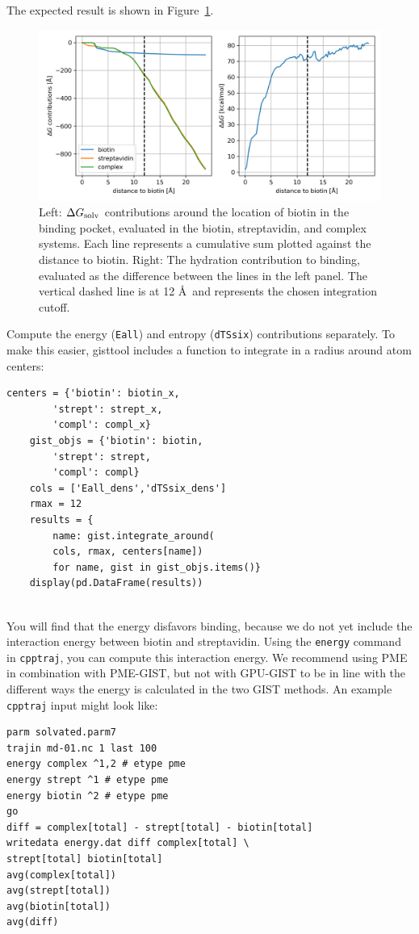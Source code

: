 \documentclass[9pt,tutorial]{livecoms}
\newcommand{\dgsolv}{\Delta G_\textup{solv}}
\newcommand{\software}{\texttt}
\newcommand\inlinecode{\texttt}
\begin{document}
The expected result is shown in Figure~\ref{fig-dg-sums}.
\begin{figure}
	\centering
	\includegraphics[width=1.0\linewidth]{figures/deltaG-difference.png}
	\caption{Left: $\dgsolv$ contributions around the location of biotin in the binding pocket, evaluated in the biotin, streptavidin, and complex systems. Each line represents a cumulative sum plotted against the distance to biotin. Right: The hydration contribution to binding, evaluated as the difference between the lines in the left panel. The vertical dashed line is at 12 \AA\ and represents the chosen integration cutoff.}\label{fig-dg-sums}
\end{figure}

Compute the energy (\inlinecode{Eall}) and entropy (\inlinecode{dTSsix}) contributions separately.
 To make this easier, gisttool includes a function to integrate in a radius around atom centers:
\begin{lstlisting}[style=python]
	centers = {'biotin': biotin_x, 
		'strept': strept_x, 
		'compl': compl_x}
	gist_objs = {'biotin': biotin, 
		'strept': strept, 
		'compl': compl}
	cols = ['Eall_dens','dTSsix_dens']
	rmax = 12
	results = {
		name: gist.integrate_around(
		cols, rmax, centers[name])
		for name, gist in gist_objs.items()}
	display(pd.DataFrame(results))
	
\end{lstlisting}
You will find that the energy disfavors binding, because we do not yet include the interaction energy between biotin and streptavidin.
Using the \inlinecode{energy} command in \software{cpptraj}, you can compute this interaction energy.
We recommend using PME in combination with PME-GIST, but not with GPU-GIST to be in line with the different ways the energy is calculated in the two GIST methods.
An example \software{cpptraj} input might look like:
\begin{lstlisting}[style=cpptraj]
parm solvated.parm7
trajin md-01.nc 1 last 100
energy complex ^1,2 # etype pme
energy strept ^1 # etype pme
energy biotin ^2 # etype pme
go
diff = complex[total] - strept[total] - biotin[total]
writedata energy.dat diff complex[total] \
strept[total] biotin[total]
avg(complex[total])
avg(strept[total])
avg(biotin[total])
avg(diff)
\end{lstlisting}
\end{document}
